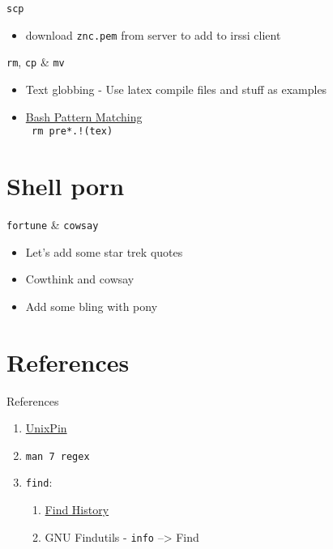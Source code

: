 \documentclass[11pt]{beamer}
\begin{document}
			\begin{frame}{ \texttt{scp}}
				\begin{itemize}
					\item download \texttt{znc.pem} from server to add to irssi client
				\end{itemize}			
			\end{frame}

			\begin{frame}{ \texttt{rm}, \texttt{cp} \& \texttt{mv}}
				\begin{itemize}
					\item Text globbing - Use latex compile files and stuff as examples
					\item \href{https://www.gnu.org/software/bash/manual/bashref.html#Pattern-Matching}{Bash Pattern Matching} \\
						\texttt{ rm pre*.!(tex) }
				\end{itemize}	
			\end{frame}

	\section[Bling]{Shell porn}

		\begin{frame}{\texttt{fortune} \& \texttt{cowsay}}
			\begin{itemize}
				\item Let's add some star trek quotes
				\item Cowthink and cowsay
				\item Add some bling with pony
			\end{itemize}
		\end{frame}

	\section{References}

		\begin{frame}{References}
			\begin{enumerate}
				\item \href{http://find.unixpin.com/}{UnixPin}
				\item \texttt{man 7 regex}
				\item {
						\texttt{find}:
						\begin{enumerate}
							\item \href{http://doc.cat-v.org/unix/find-history}{Find History}
							\item GNU Findutils - \texttt{info} --> Find
						\end{enumerate}
					}
			\end{enumerate}
		\end{frame}

\end{document}
